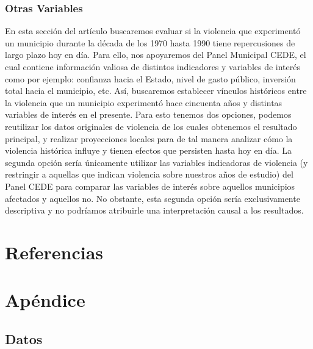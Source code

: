 \documentclass[a4paper]{article}
\begin{document}
\subsubsection{Otras Variables}
En esta sección del artículo buscaremos evaluar si la violencia que experimentó un municipio durante la década de los 1970 hasta 1990 tiene repercusiones de largo plazo hoy en día. Para ello, nos apoyaremos del Panel Municipal CEDE, el cual contiene información valiosa de distintos indicadores y variables de interés como por ejemplo: confianza hacia el Estado, nivel de gasto público, inversión total hacia el municipio, etc. Así, buscaremos establecer vínculos históricos entre la violencia que un municipio experimentó hace cincuenta años y distintas variables de interés en el presente. Para esto tenemos dos opciones, podemos reutilizar los datos originales de violencia de los cuales obtenemos el resultado principal, y realizar proyecciones locales \cite{Jorda2005EstimationProjections} para de tal manera analizar cómo la violencia histórica influye y tienen efectos que persisten hasta hoy en día. La segunda opción sería únicamente utilizar las variables indicadoras de violencia (y restringir a aquellas que indican violencia sobre nuestros años de estudio) del Panel CEDE para comparar las variables de interés sobre aquellos municipios afectados y aquellos no. No obstante, esta segunda opción sería exclusivamente descriptiva y no podríamos atribuirle una interpretación causal a los resultados.


\section{Referencias}





\section{Apéndice}
\subsection{Datos}
\end{document}
